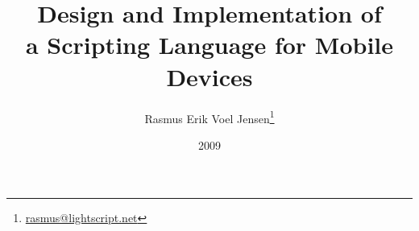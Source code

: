 \documentclass[a4paper,landscape]{slides}
\title{Design and Implementation of \\ a Scripting Language for Mobile Devices }
\author{Rasmus Erik Voel Jensen\footnote{\url{rasmus@lightscript.net}}}
\date{2009}
\begin{document}
\maketitle

\begin{comment}

- Goal:  what, why, how
  - The mobile landscape
  - Goal
  - Plan
- The developed languages
  - Yolan - intro
    - Common design and features
    - Yolan-specific design and features
  - LightScript
    - EcmaScript subset - why, what, and what not
    - LightScript design and features
  - Benchmarks
    - Approximated JAR size
    - Speed
- Conclusion and further work
  - Recent updates, LightScript 1.2
  - Further directions
    - More libraries and applications
    - Linting and pretty printing
    - Version for embedded devices
    - Zooming interfaces
  - Conclusion


- The mobile landscape
  - Phones and smartphones 
  - Symbian, Windows Mobile, iPhone, Android, RIM, other Linux'es, other proprietary operating systems
  - Java Micro Edition
    - CLDC, MIDP, APIs
    - No dynamic code loading
    - No reflection

------------------------------------------

- Introduction
  - Speech structure
    - Introduction: goal, mobile landscape
    - Body
  - The mobile landscape
    - Phones vs. smartphones
    - Java Micro Edition 
    - Scripting languages
  - Goal: A scripting language that runs on low end mobile phones
    - portable, embeddable, low memory footprint
    - expressiveness - first class functions, easy use of maps and stacks
    - loading of scripts at run time
    - a practical tool

  - Approach
    - bottom up, incremental developement
    - series of prototypes: parsers, compilers, virtual machines, forth dialects, mobile experiments, Yolan, LightScript
    - research, reimplement, reevaluate, repeat
    - direction kept in mind -- EcmaScript-like language for mobile devices
- Body
  - Yolan
    - Runs on CLDC 1.0+
    - Has standard Java classes for built in types, support for hashtables, stacks, ...
    - Scripts can be loaded as source code at run time
    - Functions are first class values
    - Fast variable access. Online execution
    - Integer only. Single false value 
  - Yolan
    - Lazy Java interface
    - Lisp like syntax. Dynamic scoping
    - Evaluation by walking through the syntax tree. Simple optimisations at execution time. Single class.
    - Sets the bar for code footprint $\approx$ 5KB
    - A stepping stone / pilot plant for LightScript
  - LightScript - introduction
  - JavaScript/EcmaScript
  - Implementation
    - Imperative top down operator precedence parser
    - Compiler
    - Stack based virtual machine
  - LightScript 1.0
    - Closures, lexical scoping, subset of EcmaScript, object, prototypical inheritance, exceptions, scripts loadable at run time 
    - Code footprint $\approx$ 11KB

- Conclusion

\end{comment}
\end{document}
